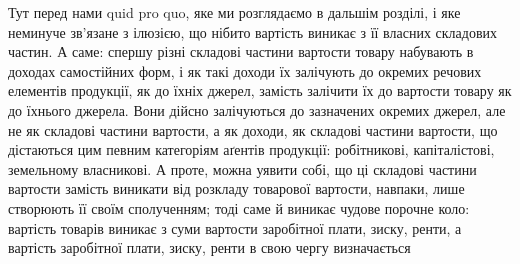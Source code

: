 Тут перед нами quid pro quo, яке ми розглядаємо в дальшім розділі, і
яке неминуче зв’язане з ілюзією, що нібито вартість виникає з її власних
складових частин. А саме: спершу різні складові частини вартости товару набувають
в доходах самостійних форм, і як такі доходи їх залічують до окремих
речових елементів продукції, як до їхніх джерел, замість залічити їх до
вартости товару як до їхнього джерела. Вони дійсно залічуються до зазначених
окремих джерел, але не як складові частини вартости, а як доходи, як складові
частини вартости, що дістаються цим певним категоріям аґентів продукції: робітникові,
капіталістові, земельному власникові. А проте, можна уявити собі, що
ці складові частини вартости замість виникати від розкладу товарової вартости,
навпаки, лише створюють її своїм сполученням; тоді саме й виникає чудове
порочне коло: вартість товарів виникає з суми вартости заробітної плати, зиску,
ренти, а вартість заробітної плати, зиску, ренти в свою чергу визначається
